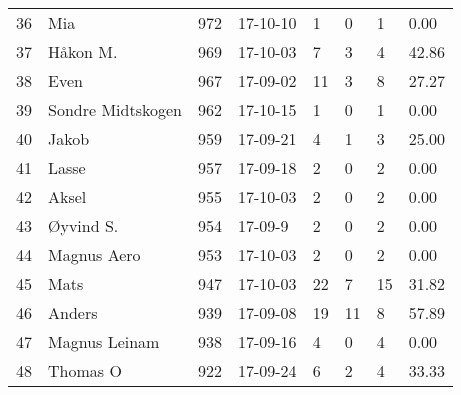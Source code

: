 \begin{longtable}{|r|l|r|l|l|l|l|l|}
36 &                  Mia &   972 &    17-10-10 &               1 &     0 &       1 &      0.00 \\
37 &             Håkon M. &   969 &    17-10-03 &               7 &     3 &       4 &     42.86 \\
38 &                 Even &   967 &    17-09-02 &              11 &     3 &       8 &     27.27 \\
39 &    Sondre Midtskogen &   962 &    17-10-15 &               1 &     0 &       1 &      0.00 \\
40 &                Jakob &   959 &    17-09-21 &               4 &     1 &       3 &     25.00 \\
41 &                Lasse &   957 &    17-09-18 &               2 &     0 &       2 &      0.00 \\
42 &                Aksel &   955 &    17-10-03 &               2 &     0 &       2 &      0.00 \\
43 &            Øyvind S. &   954 &     17-09-9 &               2 &     0 &       2 &      0.00 \\
44 &          Magnus Aero &   953 &    17-10-03 &               2 &     0 &       2 &      0.00 \\
45 &                 Mats &   947 &    17-10-03 &              22 &     7 &      15 &     31.82 \\
46 &               Anders &   939 &    17-09-08 &              19 &    11 &       8 &     57.89 \\
47 &        Magnus Leinam &   938 &    17-09-16 &               4 &     0 &       4 &      0.00 \\
48 &             Thomas O &   922 &    17-09-24 &               6 &     2 &       4 &     33.33 \\
\end{longtable}
